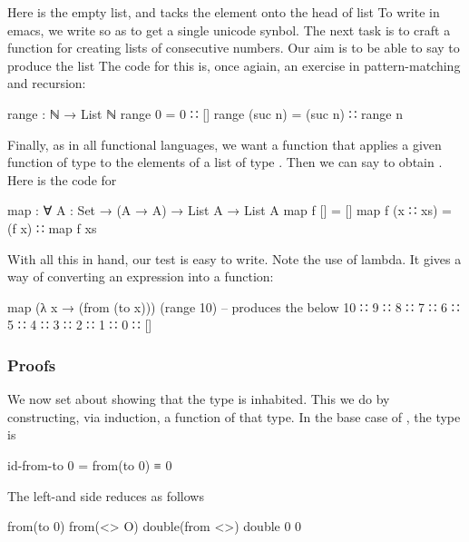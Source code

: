 Here \ccode{[]} is the empty list, and   tacks the element  onto the head of list   To write \ccode{::} in emacs, we write \code{\bs{::}} so as to get a single unicode synbol.  The next task is to craft a function  for creating lists of consecutive numbers.  Our aim is to be able to say  to produce the list  The code for this is, once agiain, an exercise in pattern-matching and recursion:

\begin{colored}[elm]
range : ℕ → List ℕ
range 0 = 0 ∷ []
range (suc n) = (suc n) ∷ range n
\end{colored}

Finally, as in all functional languages, we want a function  that applies a given function of type  to the elements of a list of type .  Then we can say  to obtain . Here is the code for 


\begin{colored}[elm]
map : ∀ {A : Set} → (A → A) → List A → List A
map f [] = []
map f (x ∷ xs) = (f x) ∷ map f xs
\end{colored}

With all this in hand, our test is easy to write.  Note the use of lambda.  It gives a way of converting an expression into a function:

\begin{colored}[elm]
map (λ x → (from (to x))) (range 10)
-- produces the below
10 ∷ 9 ∷ 8 ∷ 7 ∷ 6 ∷ 5 ∷ 4 ∷ 3 ∷ 2 ∷ 1 ∷ 0 ∷ []
\end{colored}

\subsubsection{Proofs}

We now set about showing that the type  is inhabited.  This we do by constructing, via induction, a function of that type.  In the base case of , the type is

\begin{colored}[elm]
id-from-to 0 = from(to 0) ≡ 0
\end{colored}

The left-and side reduces as follows

\begin{colored}[elm]
from(to 0)
from(<> O)
double(from <>)
double 0
0
\end{colored}

